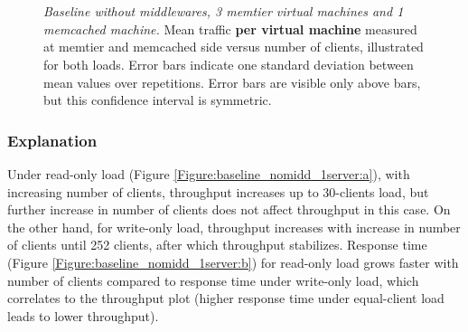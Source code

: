 \documentclass[11pt,a4paper]{article}
\begin{document}
\begin{figure}[ht!]
	\centering	
	\\
	\\
	\caption{\textit{Baseline without middlewares, 3 memtier virtual machines and 1 memcached machine.} Mean traffic \textbf{per virtual machine} measured at memtier and memcached side versus number of clients, illustrated for both loads. Error bars indicate one standard deviation between mean values over repetitions. Error bars are visible only above bars, but this confidence interval is symmetric.}
	\label{Figure:baseline_nomidd_1server_dstat} 	
\end{figure}

\subsubsection{Explanation}
Under read-only load (Figure \ref{Figure:baseline_nomidd_1server:a}), with increasing number of clients, throughput increases up to 30-clients load, but further increase in number of clients does not affect throughput in this case. On the other hand, for write-only load, throughput increases with increase in number of clients until 252 clients, after which throughput stabilizes. Response time (Figure \ref{Figure:baseline_nomidd_1server:b}) for read-only load grows faster with number of clients compared to response time under write-only load, which correlates to the throughput plot (higher response time under equal-client load leads to lower throughput).
\end{document}
